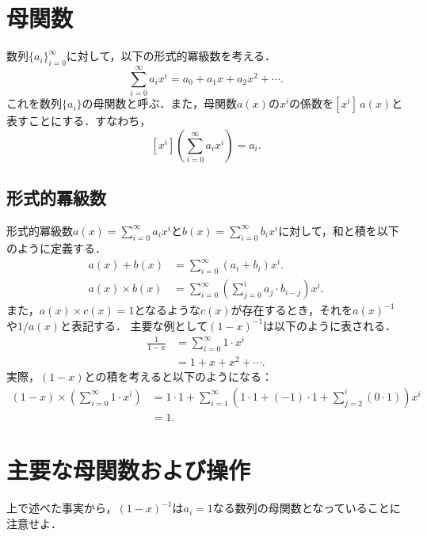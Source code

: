 \documentclass{jsarticle}
\begin{document}
\section{母関数}

数列$\{a_i\}_{i=0}^{\infty}$に対して，以下の形式的冪級数を考える．
\[\sum_{i=0}^{\infty} a_i x^i = a_0 + a_1 x + a_2 x^2 + \cdots.\]
これを数列$\{a_i\}$の母関数と呼ぶ．また，母関数$a(x)$の$x^i$の係数を$[x^i]\,a(x)$と表すことにする．すなわち，
\[[x^i]\left(\sum_{i=0}^\infty a_ix^i\right) = a_i.\]

\subsection{形式的冪級数}


形式的冪級数$a(x) = \sum_{i=0}^{\infty} a_i x^i$と$b(x) = \sum_{i=0}^{\infty} b_i x^i$に対して，和と積を以下のように定義する．
\begin{align*}
a(x) + b(x) &= \sum_{i=0}^{\infty} (a_i+b_i) x^i.\\
a(x) \times b(x) &= \sum_{i=0}^{\infty} \left(\sum_{j=0}^i a_j\cdot b_{i-j}\right) x^i.
\end{align*}
また，$a(x) \times c(x) = 1$となるような$c(x)$が存在するとき，それを$a(x)^{-1}$や$1/a(x)$と表記する．
主要な例として$(1-x)^{-1}$は以下のように表される．
\begin{align*}
  \frac{1}{1-x} &= \sum_{i=0}^\infty 1\cdot x^i\\
  &= 1 + x + x^2 + \cdots.
\end{align*}
実際，$(1-x)$との積を考えると以下のようになる：
\begin{align*}
  (1-x) \times \left(\sum_{i=0}^\infty 1\cdot x^i\right)
  &= 1\cdot 1 + \sum_{i=1}^\infty\left(1\cdot 1 + (-1)\cdot 1 + \sum_{j=2}^i (0\cdot 1)\right)x^i\\
  &= 1.
\end{align*}

\section{主要な母関数および操作}

上で述べた事実から，$(1-x)^{-1}$は$a_i = 1$なる数列の母関数となっていることに注意せよ．
\end{document}
